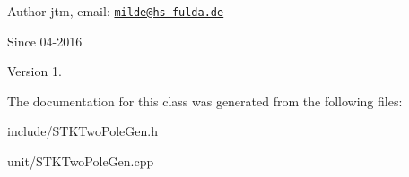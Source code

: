 \begin{DoxyAuthor}{Author}
jtm, email\+:  \href{mailto:milde@hs-fulda.de}{\tt milde@hs-\/fulda.\+de} 
\end{DoxyAuthor}
\begin{DoxySince}{Since}
04-\/2016 
\end{DoxySince}
\begin{DoxyVersion}{Version}
1. 
\end{DoxyVersion}


The documentation for this class was generated from the following files\+:\begin{DoxyCompactItemize}
\item 
include/S\+T\+K\+Two\+Pole\+Gen.\+h\item 
unit/S\+T\+K\+Two\+Pole\+Gen.\+cpp\end{DoxyCompactItemize}
